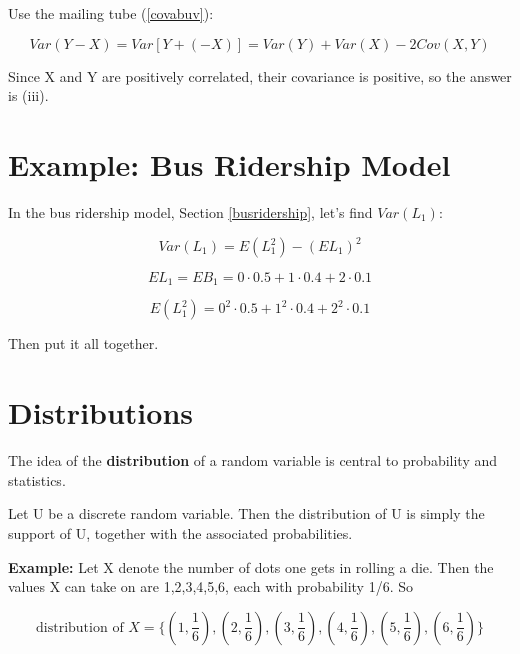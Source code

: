 Use the mailing tube (\ref{covabuv}):

\begin{equation}
Var(Y-X) = Var[Y+(-X)] = 
Var(Y) + Var(X) - 2Cov(X,Y)
\end{equation}

Since X and Y are positively correlated, their covariance is positive,
so the answer is (iii).

\section{Example:  Bus Ridership Model}

In the bus ridership model, Section \ref{busridership}, let's find
$Var(L_1)$:

\begin{equation}
Var(L_1) = E(L^2_1) - (EL_1)^2
\end{equation}

\begin{equation}
EL_1 = EB_1 = 0 \cdot 0.5 + 1 \cdot 0.4 + 2 \cdot 0.1
\end{equation}

\begin{equation}
E(L^2_1) = 0^2 \cdot 0.5 + 1^2 \cdot 0.4 + 2^2 \cdot 0.1
\end{equation}

Then put it all together.

\section{Distributions}
\label{dstrdef}

The idea of the {\bf distribution} of a random variable is central to
probability and statistics.

\begin{definition}
Let U be a discrete random variable.  Then the distribution of U is 
simply the support of U, together with  the associated probabilities. 
\end{definition}

{\bf Example:}  Let X denote the number of dots one gets in rolling a
die.  Then the values X can take on are 1,2,3,4,5,6, each with
probability 1/6.  So

\begin{equation}
\textrm{distribution of } X =
\{
(1,\frac{1}{6}),
(2,\frac{1}{6}),
(3,\frac{1}{6}),
(4,\frac{1}{6}),
(5,\frac{1}{6}),
(6,\frac{1}{6})
\}
\end{equation}

